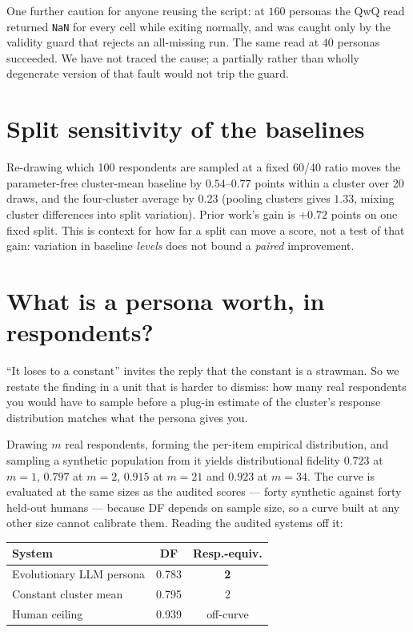 \documentclass[11pt]{article}
\begin{document}
One further caution for anyone reusing the script: at $160$ personas the QwQ
read returned \texttt{NaN} for every cell while exiting normally, and was caught
only by the validity guard that rejects an all-missing run. The same read at
$40$ personas succeeded. We have not traced the cause; a partially rather than
wholly degenerate version of that fault would not trip the guard.

\section{Split sensitivity of the baselines}
\label{app:split}

Re-drawing which 100 respondents are sampled at a
fixed 60/40 ratio moves the parameter-free cluster-mean baseline by
$0.54$--$0.77$ points within a cluster over 20 draws, and the four-cluster
average by $0.23$ (pooling clusters gives $1.33$, mixing cluster differences into
split variation). Prior work's gain is $+0.72$ points on one fixed split. This is
context for how far a split can move a score, not a test of that gain: variation
in baseline \emph{levels} does not bound a \emph{paired} improvement.

\section{What is a persona worth, in respondents?}
\label{sec:equivalents}

``It loses to a constant'' invites the reply that the constant is a strawman. So
we restate the finding in a unit that is harder to dismiss: how many real
respondents you would have to sample before a plug-in estimate of the cluster's
response distribution matches what the persona gives you.

Drawing $m$ real respondents, forming the per-item empirical distribution, and
sampling a synthetic population from it yields distributional fidelity $0.723$ at
$m{=}1$, $0.797$ at $m{=}2$, $0.915$ at $m{=}21$ and $0.923$ at $m{=}34$. The
curve is evaluated at the same sizes as the audited scores --- forty synthetic
against forty held-out humans --- because DF depends on sample size, so a curve
built at any other size cannot calibrate them. Reading the audited systems off
it:

\begin{center}\footnotesize
\setlength{\tabcolsep}{4pt}
\begin{tabular}{lcc}
\toprule
System & DF & Resp.-equiv.\\
\midrule
Evolutionary LLM persona & 0.783 & \textbf{2}\\
Constant cluster mean & 0.795 & 2\\
Human ceiling & 0.939 & off-curve\\
\bottomrule
\end{tabular}
\end{center}
\end{document}
